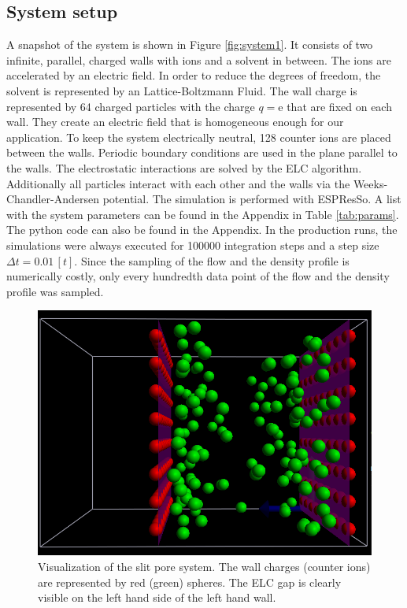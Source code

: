 \subsection{System setup}
A snapshot of the system is shown in Figure \ref{fig:system1}. It consists of two infinite, parallel, charged walls with ions and a solvent in between. The ions are accelerated by an electric field.  In order to reduce the degrees of freedom, the solvent is represented by an Lattice-Boltzmann Fluid. The wall charge is represented by 64 charged particles with the charge $q=\text{e}$ that are fixed on each wall. They create an electric field that is homogeneous enough for our application. To keep the system electrically neutral, 128 counter ions are placed between the walls. Periodic boundary conditions are used in the plane  parallel to the walls.  The electrostatic interactions are solved by the ELC algorithm. Additionally all particles interact with each other and the walls via the Weeks-Chandler-Andersen potential. The simulation is performed with ESPResSo. A list with the system parameters can be found in the Appendix in Table \ref{tab:params}.
The python code can also be found in the Appendix. In the production runs, the simulations were always executed for 100000 integration steps and a step size $\Delta t= 0.01\,[t]$. Since the sampling of the flow and the density profile is numerically costly, only  every hundredth data point of the flow and the density profile was sampled.
\begin{figure}[H]
	\centering
	\includegraphics[width=\columnwidth]{Analysis_2/system}
	\captionsetup{width=\columnwidth}
	\caption{Visualization of the slit pore system. The wall charges (counter ions) are represented by red (green) spheres. The ELC gap is clearly visible on the left hand side of the left hand wall.}
	\label{fig:system}
\end{figure}
